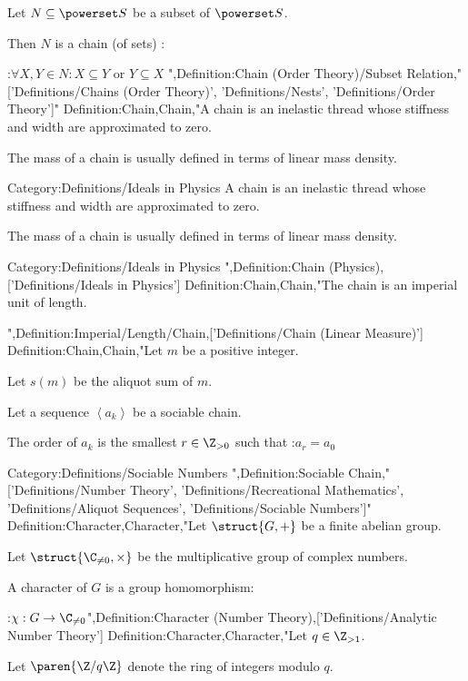 Let $N \subseteq \powerset S$ be a subset of $\powerset S$.


Then $N$ is a chain (of sets) :

:$\forall X, Y \in N: X \subseteq Y$ or $Y \subseteq X$
",Definition:Chain (Order Theory)/Subset Relation,"['Definitions/Chains (Order Theory)', 'Definitions/Nests', 'Definitions/Order Theory']"
Definition:Chain,Chain,"A chain is an inelastic thread whose stiffness and width are approximated to zero.

The mass of a chain is usually defined in terms of linear mass density.


Category:Definitions/Ideals in Physics
A chain is an inelastic thread whose stiffness and width are approximated to zero.

The mass of a chain is usually defined in terms of linear mass density.


Category:Definitions/Ideals in Physics
",Definition:Chain (Physics),['Definitions/Ideals in Physics']
Definition:Chain,Chain,"The chain is an imperial unit of length.









",Definition:Imperial/Length/Chain,['Definitions/Chain (Linear Measure)']
Definition:Chain,Chain,"Let $m$ be a positive integer.

Let $s \left({m}\right)$ be the aliquot sum of $m$.


Let a sequence $\left\langle{a_k}\right\rangle$ be a sociable chain.

The order of $a_k$ is the smallest $r \in \Z_{>0}$ such that
:$a_r = a_0$


Category:Definitions/Sociable Numbers
",Definition:Sociable Chain,"['Definitions/Number Theory', 'Definitions/Recreational Mathematics', 'Definitions/Aliquot Sequences', 'Definitions/Sociable Numbers']"
Definition:Character,Character,"Let $\struct {G, +}$ be a finite abelian group.

Let $\struct {\C_{\ne 0}, \times}$ be the multiplicative group of complex numbers.


A character of $G$ is a group homomorphism:

:$\chi: G \to \C_{\ne 0}$",Definition:Character (Number Theory),['Definitions/Analytic Number Theory']
Definition:Character,Character,"Let $q \in \Z_{>1}$.

Let $\paren {\Z / q \Z}$ denote the ring of integers modulo $q$.

